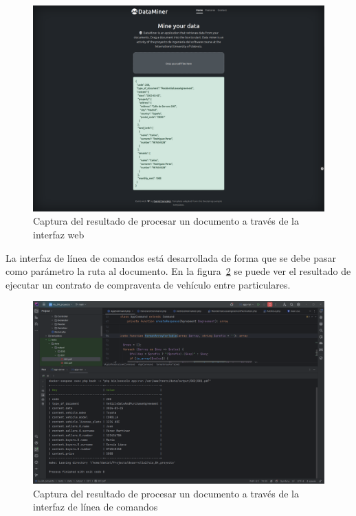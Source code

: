 \begin{figure}[ht]
    \begin{center}
        \includegraphics[width=\textwidth]{./chapter/5/images/chapter_5.1.web_interface}
        \caption{Captura del resultado de procesar un documento a través de la interfaz web}
        \label{fig:chapter_5.1.web_interface}
    \end{center}
\end{figure}

La interfaz de línea de comandos está desarrollada de forma que se debe pasar como parámetro la ruta al documento.
En la figura~\ref{fig:chapter_5.1.cli_interface} se puede ver el resultado de ejecutar un contrato de compraventa de
vehículo entre particulares.

\begin{figure}[ht]
    \begin{center}
        \includegraphics[width=\textwidth]{./chapter/5/images/chapter_5.1.cli_interface}
        \caption{Captura del resultado de procesar un documento a través de la interfaz de línea de comandos}
        \label{fig:chapter_5.1.cli_interface}
    \end{center}
\end{figure}
